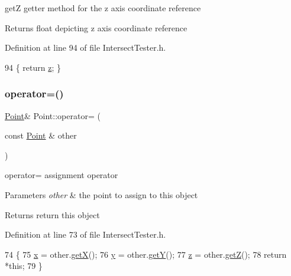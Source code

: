 getZ getter method for the z axis coordinate reference 

\begin{DoxyReturn}{Returns}
float depicting z axis coordinate reference 
\end{DoxyReturn}


Definition at line 94 of file Intersect\+Tester.\+h.


\begin{DoxyCode}
94 \{ \textcolor{keywordflow}{return} \hyperlink{class_point_a9a666531e0e99adff132be93d2407d0c}{z}; \}
\end{DoxyCode}
\mbox{\label{class_point_a0e75bb40a406c615b5632f36fa035a47}} 
\subsubsection{\texorpdfstring{operator=()}{operator=()}}
{\footnotesize\ttfamily \hyperlink{class_point}{Point}\& Point\+::operator= (\begin{DoxyParamCaption}\item[{const \hyperlink{class_point}{Point} \&}]{other }\end{DoxyParamCaption})\hspace{0.3cm}{\ttfamily [inline]}}



operator= assignment operator 


\begin{DoxyParams}{Parameters}
{\em other} & the point to assign to this object \\
\hline
\end{DoxyParams}
\begin{DoxyReturn}{Returns}
return this object 
\end{DoxyReturn}


Definition at line 73 of file Intersect\+Tester.\+h.


\begin{DoxyCode}
74          \{
75              \hyperlink{class_point_a05dfe2dfbde813ad234b514f30e662f1}{x} = other.\hyperlink{class_point_a29c44ec7c7279e02629645a06cdaf7d5}{getX}();
76              \hyperlink{class_point_a6101960c8d2d4e8ea1d32c9234bbeb8d}{y} = other.\hyperlink{class_point_a2371ffadbe245d12a8f556d0a976521b}{getY}();
77              \hyperlink{class_point_a9a666531e0e99adff132be93d2407d0c}{z} = other.\hyperlink{class_point_a9bb9987e32b7dd8dec81ead5d428446c}{getZ}();
78              \textcolor{keywordflow}{return} *\textcolor{keyword}{this};
79          \}
\end{DoxyCode}
\mbox{\label{class_point_a337d4410acd500f972f87f4fc73a43fe}} 
